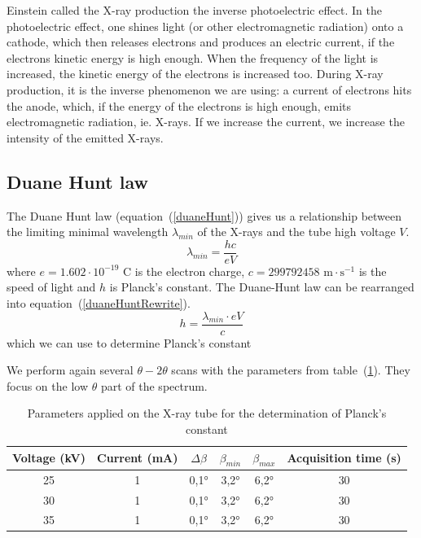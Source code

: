 \documentclass{scrartcl}
\begin{document}
\noindent Einstein called the X-ray production the inverse photoelectric effect. In the photoelectric effect, one shines light (or other electromagnetic radiation) onto a cathode, which then releases electrons and produces an electric current, if the electrons kinetic energy is high enough. When the frequency of the light is increased, the kinetic energy of the electrons is increased too. During X-ray production, it is the inverse phenomenon we are using: a current of electrons hits the anode, which, if the energy of the electrons is high enough, emits electromagnetic radiation, ie. X-rays. If we increase the current, we increase the intensity of the emitted X-rays.

\subsection{Duane Hunt law} \label{sectionDuaneHunt}

\noindent The Duane Hunt law (equation~(\ref{duaneHunt})) gives us a relationship between the limiting minimal wavelength $\lambda_{min}$ of the X-rays and the tube high voltage $V$.
\begin{equation}
    \lambda_{min} = \frac{hc}{eV}
    \label{duaneHunt}
\end{equation} where $e = 1.602 \cdot 10^{-19}$ C is the electron charge, $c = 299792458$ $\text{m} \cdot \text{s}^{-1}$ is the speed of light and $h$ is Planck's constant. The Duane-Hunt law can be rearranged into equation~(\ref{duaneHuntRewrite}). \begin{equation} h = \frac{\lambda_{min} \cdot eV}{c} \label{duaneHuntRewrite}\end{equation} which we can use to determine Planck's constant

\noindent We perform again several $\theta-2\theta$ scans with the parameters from table~(\ref{tab:parametersDuaneHunt}). They focus on the low $\theta$ part of the spectrum.

\begin{table}[!ht]
    \centering
    \begin{tabular}{c|c|c|c|c|c}
    Voltage (kV) & Current (mA) & $\Delta \beta$ & $\beta_{min}$   &  $\beta_{max}$   &  Acquisition time (s) \\ \hline
    25  & 1 & 0,1° & 3,2° & 6,2° & 30 \\
    30 & 1 & 0,1° & 3,2° & 6,2° & 30 \\
    35 & 1 & 0,1° & 3,2° & 6,2° & 30
    \end{tabular}
    \caption{Parameters applied on the X-ray tube for the determination of Planck's constant}
    \label{tab:parametersDuaneHunt}
\end{table}
\FloatBarrier
\end{document}
